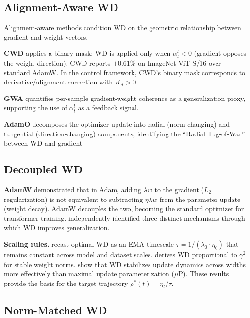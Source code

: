 \documentclass{article}
\begin{document}
\subsection{Alignment-Aware WD}

Alignment-aware methods condition WD on the geometric relationship between gradient and weight vectors.

\textbf{CWD} \citep{chen2026cwd} applies a binary mask: WD is applied only when $\alpha_t^l < 0$ (gradient opposes the weight direction). CWD reports $+0.61\%$ on ImageNet ViT-S/16 over standard AdamW. In the control framework, CWD's binary mask corresponds to derivative/alignment correction with $K_d > 0$.

\textbf{GWA} \citep{holzl2025gwa} quantifies per-sample gradient-weight coherence as a generalization proxy, supporting the use of $\alpha_t^l$ as a feedback signal.

\textbf{AdamO} \citep{chen2026adamo} decomposes the optimizer update into radial (norm-changing) and tangential (direction-changing) components, identifying the ``Radial Tug-of-War'' between WD and gradient.

\subsection{Decoupled WD}

\textbf{AdamW} \citep{loshchilov2019adamw} demonstrated that in Adam, adding $\lambda w$ to the gradient ($L_2$ regularization) is not equivalent to subtracting $\eta \lambda w$ from the parameter update (weight decay). AdamW decouples the two, becoming the standard optimizer for transformer training. \citet{zhang2018wd} independently identified three distinct mechanisms through which WD improves generalization.

\textbf{Scaling rules.} \citet{wang2025ema} recast optimal WD as an EMA timescale $\tau = 1/(\lambda_0 \cdot \eta_0)$ that remains constant across model and dataset scales. \citet{chou2025wd} derives WD proportional to $\gamma^2$ for stable weight norms. \citet{kosson2025wd} show that WD stabilizes update dynamics across widths more effectively than maximal update parameterization ($\mu$P). These results provide the basis for the target trajectory $\rho^*(t) = \eta_t / \tau$.

\subsection{Norm-Matched WD}
\end{document}
